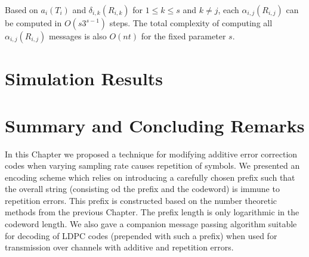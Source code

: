 {Based on $a_i(T_i)$ and $\delta_{i,k}(R_{i,k})$ for $1 \leq k \leq
s$ and $k \neq j$, each $\alpha_{i,j}(R_{i,j})$ can be computed in
$O(s3^{s-1})$ steps. The total complexity of computing all
$\alpha_{i,j}(R_{i,j})$ messages is also $O(nt)$ for the fixed
parameter $s$.




\section{Simulation Results}
\vspace{4.2in}}
\section{Summary and Concluding Remarks}

In this Chapter we proposed a technique for modifying additive
error correction codes when varying sampling rate causes
repetition of symbols. We presented an encoding scheme which
relies on introducing a carefully chosen prefix such that the
overall string (consisting od the prefix and the codeword) is
immune to repetition errors. This prefix is constructed based on
the number theoretic methods from the previous Chapter. The prefix
length is only logarithmic in the codeword length. We also gave a
companion message passing algorithm suitable for decoding of LDPC
codes (prepended with such a prefix) when used for transmission
over channels with additive and repetition errors.
